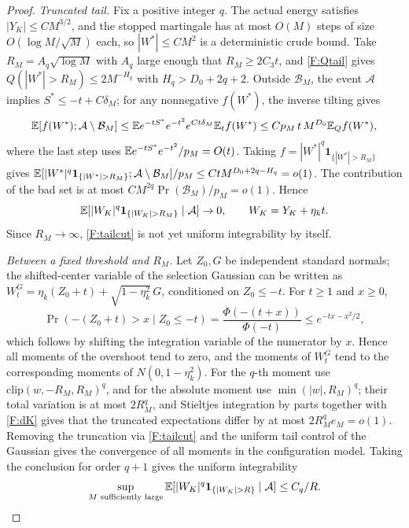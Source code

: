 \begin{proof}
\emph{Truncated tail.} Fix a positive integer $q$. The actual energy satisfies
$|Y_K|\le CM^{3/2}$, and the stopped martingale has at most $O(M)$ steps of size
$O(\log M/\sqrt M)$ each, so $|W^*|\le CM^2$ is a deterministic crude bound. Take
$R_M=A_q\sqrt{\log M}$ with $A_q$ large enough that $R_M\ge2C_3t$, and \eqref{F:Qtail} gives
$Q(|W^*|>R_M)\le2M^{-H_q}$ with $H_q>D_0+2q+2$. Outside $\mathcal B_M$, the event
$\mathcal A$ implies $S^*\le-t+C\delta_M$; for any nonnegative $f(W^*)$, the inverse tilting
gives
\[
\mathbb E[f(W^*);\mathcal A\setminus\mathcal B_M]\le\mathbb E e^{-tS^*}e^{-t^2}e^{Ct\delta_M}\mathbb E_tf(W^*)\le Cp_M\,t\,M^{D_0}\mathbb E_Qf(W^*),
\]
where the last step uses $\mathbb E e^{-tS^*}e^{-t^2}/p_M=O(t)$. Taking
$f=|W^*|^q\mathbf1_{\{|W^*|>R_M\}}$ gives
$\E[|W^*|^q\mathbf1_{\{|W^*|>R_M\}};\mathcal A\setminus\mathcal B_M]/p_M\le
CtM^{D_0+2q-H_q}=o(1)$. The contribution of the bad set is at most
$CM^{2q}\Pr(\mathcal B_M)/p_M=o(1)$. Hence
\begin{equation}
\E[|W_K|^q\mathbf1_{\{|W_K|>R_M\}}\mid \mathcal A]\to0,\qquad W_K=Y_K+\eta_kt.\label{F:tailcut}
\end{equation}
Since $R_M\to\infty$, \eqref{F:tailcut} is not yet uniform integrability by itself.

\emph{Between a fixed threshold and $R_M$.} Let $Z_0,G$ be independent standard normals; the
shifted-center variable of the selection Gaussian can be written as
$W^G_t=\eta_k(Z_0+t)+\sqrt{1-\eta_k^2}\,G$, conditioned on $Z_0\le-t$. For $t\ge1$ and $x\ge0$,
\[
\Pr(-(Z_0+t)>x\mid Z_0\le-t)=\frac{\Phi(-(t+x))}{\Phi(-t)}\le e^{-tx-x^2/2},
\]
which follows by shifting the integration variable of the numerator by $x$. Hence all moments of
the overshoot tend to zero, and the moments of $W^G_t$ tend to the corresponding moments of
$N(0,1-\eta_k^2)$. For the $q$-th moment use $\mathrm{clip}(w,-R_M,R_M)^q$, and for the absolute
moment use $\min(|w|,R_M)^q$; their total variation is at most $2R_M^q$, and Stieltjes integration
by parts together with \eqref{F:dK} gives that the truncated expectations differ by at most
$2R_M^qe_M=o(1)$. Removing the truncation via \eqref{F:tailcut} and the uniform tail control of
the Gaussian gives the convergence of all moments in the configuration model. Taking the
conclusion for order $q+1$ gives the uniform integrability
\begin{equation}
\sup_{M\text{ sufficiently large}}\E[|W_K|^q\mathbf1_{\{|W_K|>R\}}\mid \mathcal A]\le C_q/R.\label{F:UI}
\end{equation}


\end{proof}

